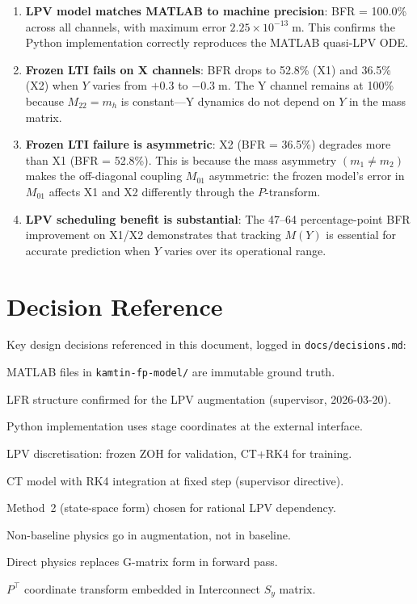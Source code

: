 \documentclass[11pt,a4paper]{article}
\newcommand{\T}{^{\!\top}}
\begin{document}
\begin{enumerate}
\item \textbf{LPV model matches MATLAB to machine precision}: BFR = 100.0\% across all
  channels, with maximum error $2.25 \times 10^{-13}\;\text{m}$. This confirms the Python
  implementation correctly reproduces the MATLAB quasi-LPV ODE.

\item \textbf{Frozen LTI fails on X channels}: BFR drops to 52.8\% (X1) and 36.5\% (X2)
  when $Y$ varies from $+0.3$ to $-0.3\;\text{m}$. The Y channel remains at 100\% because
  $M_{22} = m_h$ is constant---Y dynamics do not depend on $Y$ in the mass matrix.

\item \textbf{Frozen LTI failure is asymmetric}: X2 (BFR = 36.5\%) degrades more than X1
  (BFR = 52.8\%). This is because the mass asymmetry $(m_1 \neq m_2)$ makes the off-diagonal
  coupling $M_{01}$ asymmetric: the frozen model's error in $M_{01}$ affects X1 and X2
  differently through the $P$-transform.

\item \textbf{LPV scheduling benefit is substantial}: The 47--64 percentage-point BFR
  improvement on X1/X2 demonstrates that tracking $M(Y)$ is essential for accurate prediction
  when $Y$ varies over its operational range.
\end{enumerate}


\section*{Decision Reference}

Key design decisions referenced in this document, logged in
\texttt{docs/decisions.md}:

\begin{description}[nosep,font=\ttfamily]
\item[D-002] MATLAB files in \texttt{kamtin-fp-model/} are immutable ground truth.
\item[D-005] LFR structure confirmed for the LPV augmentation (supervisor, 2026-03-20).
\item[D-006] Python implementation uses stage coordinates at the external interface.
\item[D-012] LPV discretisation: frozen ZOH for validation, CT+RK4 for training.
\item[D-018] CT model with RK4 integration at fixed step (supervisor directive).
\item[D-020] Method~2 (state-space form) chosen for rational LPV dependency.
\item[D-022] Non-baseline physics go in augmentation, not in baseline.
\item[D-026] Direct physics replaces G-matrix form in forward pass.
\item[D-027] $P\T$ coordinate transform embedded in Interconnect $S_y$ matrix.
\end{description}
\end{document}
